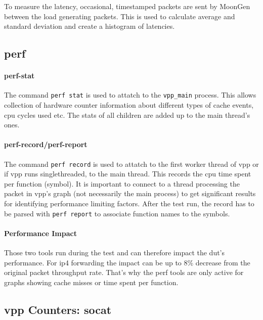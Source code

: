 To measure the latency, occasional, timestamped packets are sent by
MoonGen between the load generating packets. This is used to calculate
average and standard deviation and create a histogram of latencies.


\subsection{\Ac{perf}}

\paragraph{perf-stat} 

The command \lstinline|perf stat| is used to attatch to the
\lstinline|vpp_main| process. This allows collection of hardware
counter information about different types of cache events, cpu cycles
used etc. The stats of all children are added up to the main thread's
ones.

\paragraph{perf-record/perf-report}
\label{sec:perf}

The command \lstinline|perf record| is used to attatch to the first
worker thread of \Ac{vpp} or if vpp runs singlethreaded, to the main
thread. This records the cpu time spent per function (symbol). It is
important to connect to a thread processing the packet in \Ac{vpp}'s
graph (not necessarily the main process) to get significant results
for identifying performance limiting factors. After the test run, the
record has to be parsed with \lstinline|perf report| to associate
function names to the symbols.

\paragraph{Performance Impact}

Those two tools run during the test and can therefore impact the
\Ac{dut}'s performance. For \Ac{ip4} forwarding the impact can be up
to 8\% decrease from the original packet throughput rate. That's why
the \Ac{perf} tools are only active for graphs showing cache misses or
time spent per function. 


\subsection{\Ac{vpp} Counters: socat}
\label{sec:vppcounters}

